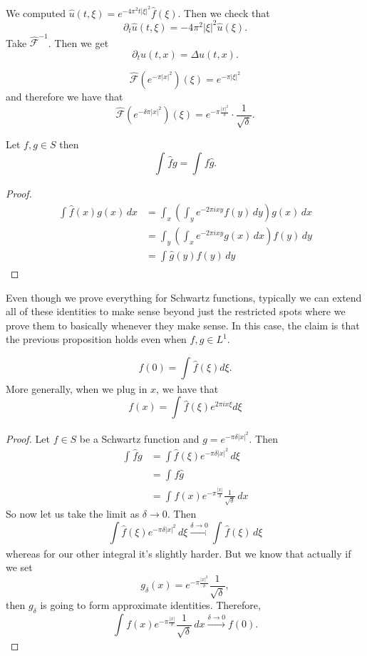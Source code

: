 We computed \( \hat u(t, \xi) = e^{-4 \pi^{2} t | \xi|^{2}}\hat f( \xi) \). Then we check that
\[ \partial_{t} \hat u(t, \xi) = - 4 \pi^{2} | \xi|^{2} \hat u( \xi). \]
Take \( \hat {\mathcal{F}}^{-1} \). Then we get
\[ \partial_{t} u(t, x) = \Delta u(t, x). \]

\begin{lemma}
	\[ \hat {\mathcal{F}} \left( e^{- \pi |x|^{2}} \right)( \xi) = e^{- \pi | \xi|^{2}} \]
	and therefore we have that
	\[ \hat {\mathcal{F}} \left( e^{- \delta \pi |x|^{2}} \right) ( \xi) = e^{- \pi \frac{|x|^{2}}{\delta}} \cdot \frac{1}{\sqrt{\delta}}. \]
\end{lemma}

\begin{proposition}
	Let \( f, g \in S \) then
	\[ \int_{} \hat f g = \int_{} f \hat g. \]
\end{proposition}
\begin{proof}
	\begin{align*}
		\int_{} \hat f(x) g(x) \, dx &= \int_{x} \left( \int_{y} e^{-2 \pi i x y}f(y) \, dy \right)g(x) \, dx \\
		\tag{Fubini}																 &= \int_{y} \left( \int_{x} e^{-2 \pi i x y}g(x) \, dx \right)f(y) \, dy \\
																								 &= \int_{} \hat g(y) f(y) \, dy
	\end{align*}
\end{proof}

\begin{remark}
	Even though we prove everything for Schwartz functions, typically we can extend all of these identities to make sense beyond just the restricted spots where we prove them to basically whenever they make sense. In this case, the claim is that the previous proposition holds even when \( f, g \in L^{1} \).
\end{remark}

\begin{proposition}
	\[ f(0) = \int_{} \hat f( \xi) d \xi. \]
	More generally, when we plug in \( x \), we have that
	\[ f(x) = \int_{} \hat f(\xi) e^{2 \pi i x \xi} d \xi\]
\end{proposition}
\begin{proof}
	Let \( f \in S \) be a Schwartz function and \( g = e^{- \pi \delta |x|^{2}} \). Then
	\begin{align*} 
		\int_{} \hat f g &= \int \hat f(\xi) e^{- \pi \delta |x|^{2}} \, d \xi \\
										 &= \int_{} f \hat g\\
										 &= \int_{} f(x) e^{- \pi \frac{|x|}{\delta}} \frac{1}{\sqrt{\delta}} \, dx
	\end{align*}
	So now let us take the limit as \( \delta \to 0 \). Then
	\[ \int \hat f(\xi) e^{- \pi \delta |x|^{2}} \, d \xi \xrightarrow{\delta \to 0} \int_{} \hat f(\xi) \, d \xi \]
	whereas for our other integral it's slightly harder. But we know that actually if we set
	\[ g_{\delta}(x) = e^{- \pi \frac{|x|^{2}}{\delta}} \frac{1}{\sqrt{\delta}}, \]
	then \( g_{\delta} \) is going to form approximate identities. Therefore,
	\[
		\int_{} f(x) e^{- \pi \frac{|x|}{\delta}} \frac{1}{\sqrt{\delta}} \, dx \xrightarrow{\delta \to 0} f(0).
	\]
	
\end{proof}

